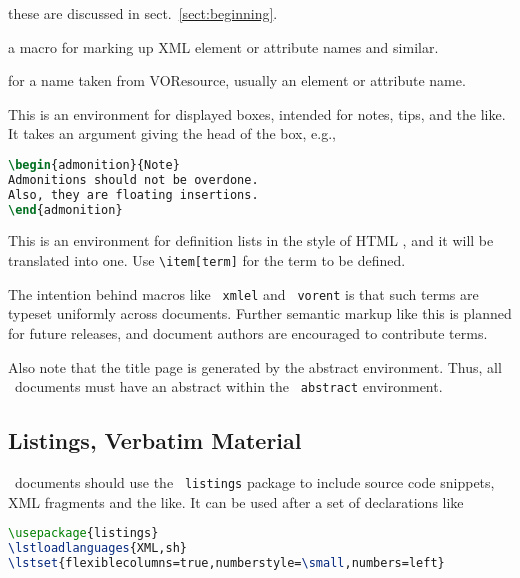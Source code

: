\documentclass[11pt,a4paper]{ivoa}
\newcommand{\texword}[1]{\texttt{\color{texcolor} #1}}
\begin{document}
\begin{bigdescription}
\item[\texword{author}, \texword{previousversion}] these are discussed
in sect.~\ref{sect:beginning}.
\item[\texword{xmlel}] a macro for marking up XML element or attribute
names and similar.  
\item[\texword{vorent}] for a name taken from VOResource, usually an
element or attribute name.
\item[\texword{admonition}] This is an environment for 
displayed boxes, intended for notes, tips, and the like.  
It takes an argument giving the head of the box, e.g.,

\begin{lstlisting}[language=TeX]
\begin{admonition}{Note}
Admonitions should not be overdone.  
Also, they are floating insertions.
\end{admonition}
\end{lstlisting}
\item[\texword{bigdescription}] This is an environment for definition
lists in the style of HTML , and it will be translated into
one.  Use \verb|\item[term]| for the term to be defined.
\end{bigdescription}

The intention behind macros like \texword{xmlel} and \texword{vorent} is
that such terms are typeset uniformly across documents.  Further
semantic markup like this is planned for future releases, and document
authors are encouraged to contribute terms.

Also note that the title page is generated by the abstract environment.
Thus, all \ivoatex\ documents must have an abstract within the
\texword{abstract} environment.

\subsection{Listings, Verbatim Material}

\ivoatex\ documents should use the \texword{listings} package to include
source code snippets, XML fragments and the like.  It can be used after
a set of declarations like

\begin{lstlisting}[language=TeX]
\usepackage{listings}
\lstloadlanguages{XML,sh}
\lstset{flexiblecolumns=true,numberstyle=\small,numbers=left}
\end{lstlisting}
\end{document}
